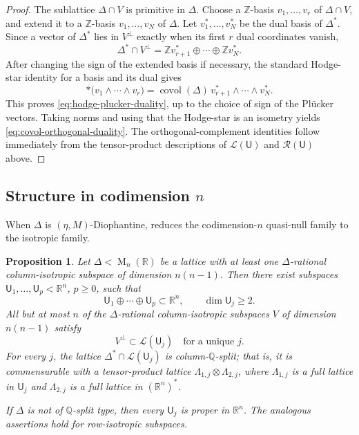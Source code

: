 \documentclass[reqno,11pt]{amsart}
\numberwithin{equation}{section}
\newtheorem{proposition}[theorem]{Proposition}
\theoremstyle{definition}
\theoremstyle{remark}
\newcommand{\op}{\operatorname}
\newcommand{\R}{\mathbb R}
\newcommand{\M}{\op{M}}
\newcommand{\covol}{\op{covol}}
\begin{document}
\begin{proof}
The sublattice $\Delta\cap V$ is primitive in $\Delta$. Choose a
$\mathbb Z$-basis $v_1,\ldots,v_r$ of $\Delta\cap V$, and extend it
to a $\mathbb Z$-basis $v_1,\ldots,v_N$ of $\Delta$. Let
$v_1^*,\ldots,v_N^*$ be the dual basis of $\Delta^*$. Since a vector
of $\Delta^*$ lies in $V^\perp$ exactly when its first $r$ dual
coordinates vanish,
$$
\Delta^*\cap V^\perp
=
\mathbb Zv_{r+1}^*\oplus\cdots\oplus\mathbb Zv_N^*.
$$
After changing the sign of the extended basis if necessary, the standard
Hodge-star identity for a basis and its dual gives
$$
\ast\bigl(v_1\wedge\cdots\wedge v_r\bigr)
=
\covol(\Delta)
\,v_{r+1}^*\wedge\cdots\wedge v_N^*.
$$
This proves \eqref{eq:hodge-plucker-duality}, up to the choice
 of sign of the Pl\"ucker vectors. Taking norms and using that the Hodge-star
is an isometry yields \eqref{eq:covol-orthogonal-duality}.
The orthogonal-complement identities follow immediately from the
tensor-product descriptions of $\mathcal L(\mathsf U)$ and
$\mathcal R(\mathsf U)$ above.
\end{proof}


\subsection{Structure in codimension $n$}
When $\Delta$ is $(\eta,M)$-Diophantine,  reduces the
codimension-$n$ quasi-null family to the isotropic family. 

\begin{proposition}\label{lem:global-isotropic-structure}
Let $\Delta<\M_n(\R)$ be a lattice with at least one $\Delta$-rational column-isotropic subspace of dimension $n(n-1)$. Then there exist subspaces
$\mathsf U_1,\ldots,\mathsf U_p<\R^n$, $p\ge 0$, such that
$$
\mathsf U_1\oplus\cdots\oplus \mathsf U_p\subset\R^n,
\qquad
\dim \mathsf U_j\ge2.
$$
All but at most $n$ of the $\Delta$-rational column-isotropic subspaces
$V$ of dimension $n(n-1)$ satisfy
$$
V^\perp\subset\mathcal L(\mathsf U_j)
\quad\text{for a unique $j$}.
$$
For every $j$, the lattice
$\Delta^*\cap\mathcal L(\mathsf U_j)$ is column-$\mathbb Q$-split; that
is, it is commensurable with a tensor-product lattice
$\Lambda_{1,j}\otimes\Lambda_{2,j}$, where $\Lambda_{1,j}$ is a full
lattice in $\mathsf U_j$ and $\Lambda_{2,j}$ is a full lattice in
$(\R^n)^*$.

If $\Delta$ is not of $\mathbb Q$-split type, then every $\mathsf U_j$ is
proper in $\R^n$. The analogous assertions hold for row-isotropic
subspaces.
\end{proposition}
\end{document}
